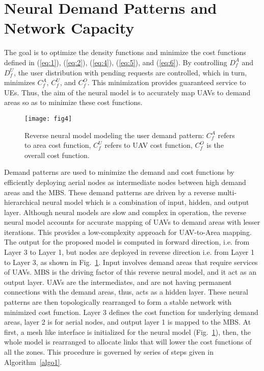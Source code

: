 \documentclass[journal]{IEEEtran}
\begin{document}
\section{Neural Demand Patterns and Network Capacity}
The goal is to optimize the density functions and minimize the cost functions defined in (\ref{eq:1}), (\ref{eq:2}), (\ref{eq:4}), (\ref{eq:5}), and (\ref{eq:6}). By controlling $D_{f}^{A}$ and $D_{f}^{U}$, the user distribution with pending requests are controlled, which in turn, minimizes $C_{f}^{A}$, $C_{f}^{U}$, and $C_{f}^{O}$. This minimization provides guaranteed service to UEs. Thus, the aim of the neural model is to accurately map UAVs to demand areas so as to minimize these cost functions.
\begin{figure}[!ht]
  \centering
\texttt{[image: fig4]}\\
  \caption{Reverse neural model modeling the user demand pattern: $C_{f}^{A}$ refers to area cost function, $C_{f}^{U}$ refers to UAV cost function, $C_{f}^{O}$ is the overall cost function.}\label{fig4}
\end{figure}
Demand patterns are used to minimize the demand and cost functions by efficiently deploying aerial nodes as intermediate nodes between high demand areas and the MBS. These demand patterns are driven by a reverse multi-hierarchical neural model which is a combination of input, hidden, and output layer. Although neural models are slow and complex in operation, the reverse neural model accounts for accurate mapping of UAVs to demand areas with lesser iterations. This provides a low-complexity approach for UAV-to-Area mapping. The output for the proposed model is computed in forward direction, i.e. from Layer 3 to Layer 1, but nodes are deployed in reverse direction i.e. from Layer 1 to Layer 3, as shown in Fig.~\ref{fig4}. Input involves demand areas that require services of UAVs. MBS is the driving factor of this reverse neural model, and it act as an output layer. UAVs are the intermediates, and are not having permanent connections with the demand areas, thus, acts as a hidden layer. These neural patterns are then topologically rearranged to form a stable network with minimized cost function. Layer 3 defines the cost function for underlying demand areas, layer 2 is for aerial nodes, and output layer 1 is mapped to the MBS. At first, a mesh like interface is initialized for the neural model (Fig.~\ref{fig4}), then, the whole model is rearranged to allocate links that will lower the cost functions of all the zones. This procedure is governed by series of steps given in Algorithm~\ref{algo1}.
\end{document}

